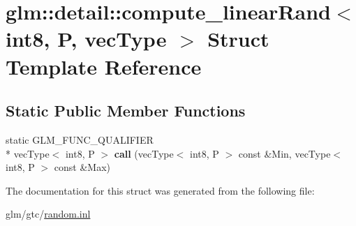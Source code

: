 \hypertarget{structglm_1_1detail_1_1compute__linearRand_3_01int8_00_01P_00_01vecType_01_4}{\section{glm\-:\-:detail\-:\-:compute\-\_\-linear\-Rand$<$ int8, P, vec\-Type $>$ Struct Template Reference}
\label{structglm_1_1detail_1_1compute__linearRand_3_01int8_00_01P_00_01vecType_01_4}
}
\subsection*{Static Public Member Functions}
\begin{DoxyCompactItemize}
\item 
\hypertarget{structglm_1_1detail_1_1compute__linearRand_3_01int8_00_01P_00_01vecType_01_4_a0ce1c78af3d0d236a2bf50646d60bc8b}{static G\-L\-M\-\_\-\-F\-U\-N\-C\-\_\-\-Q\-U\-A\-L\-I\-F\-I\-E\-R \\*
vec\-Type$<$ int8, P $>$ {\bfseries call} (vec\-Type$<$ int8, P $>$ const \&Min, vec\-Type$<$ int8, P $>$ const \&Max)}\label{structglm_1_1detail_1_1compute__linearRand_3_01int8_00_01P_00_01vecType_01_4_a0ce1c78af3d0d236a2bf50646d60bc8b}

\end{DoxyCompactItemize}


The documentation for this struct was generated from the following file\-:\begin{DoxyCompactItemize}
\item 
glm/gtc/\hyperlink{random_8inl}{random.\-inl}\end{DoxyCompactItemize}
